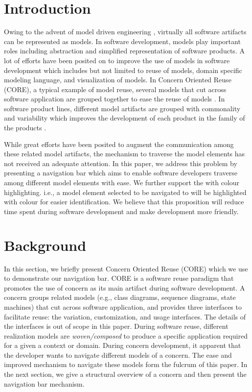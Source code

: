 
\section{Introduction} \label{intro}
{O}{wing} to the advent of model driven engineering \cite{brambilla2012model,schmidt}, virtually all software artifacts can be represented as models. In software development, models play important roles including abstraction and simplified representation of software products. A lot of efforts have been posited on to improve the use of models in software development which includes but not limited to reuse of models, domain specific modeling language, and visualization of models. In Concern Oriented Reuse (CORE), a typical example of model reuse, several models that cut across software application are grouped together to ease the reuse of models \cite{alam2013concern2}. In software product lines, different model artifacts are grouped with commonality and variability which improves the development of each product in the family of the products \cite{spl}.

While great efforts have been posited to augment the communication among these related model artifacts, the mechanism to traverse the model elements has not received an adequate attention. In this paper, we address this problem by presenting a navigation bar which aims to enable software developers traverse among different model elements with ease. We further support the with colour highlighting. i.e., a model element selected to be navigated to will be highlighted with colour for easier identification. We believe that this proposition will reduce time spent during software development and make development more friendly.

\section{Background} \label{background}
In this section, we briefly present Concern Oriented Reuse (CORE) which we use to demonstrate our navigation bar. CORE is a software reuse paradigm that promotes the use of concern as its main artifact during software development. A concern groups related models (e.g., class diagrams, sequence diagrams, state machines) that cut across software application, and provides three interfaces to facilitate reuse: the variation, customization, and usage interfaces. The details of the interfaces is out of scope in this paper.  During software reuse, different realization models are \textit{woven/composed} to produce a specific application required for a given a context or domain. During concern development, it apparent that the developer wants to navigate different models of a concern. The ease and improved mechanism to navigate these models form the fulcrum of this paper. In the next section, we give a structural overview of a concern and then present the navigation bar mechanism.

